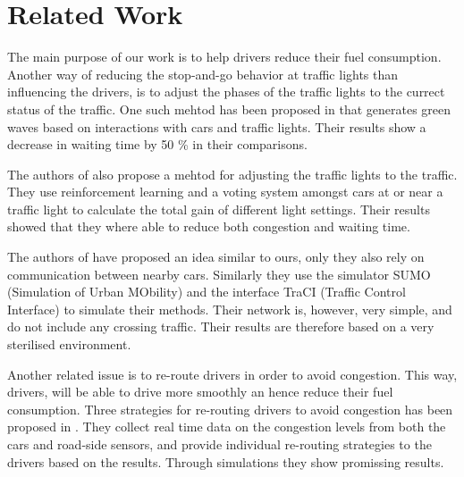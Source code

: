 \section{Related Work}

The main purpose of our work is to help drivers reduce their fuel consumption.
Another way of reducing the stop-and-go behavior at traffic lights than influencing the drivers, is to adjust the phases of the traffic lights to the currect status of the traffic. One such mehtod has been proposed in \cite{SOTL} that generates green waves based on interactions with cars and traffic lights. Their results show a decrease in waiting time by 50 \% in their comparisons.

The authors of \cite{ITLC} also propose a mehtod for adjusting the traffic lights to the traffic. They use reinforcement learning and a voting system amongst cars at or near a traffic light to calculate the total gain of different light settings. Their results showed that they where able to reduce both congestion and waiting time.

The authors of \cite{VANETsim} have proposed an idea similar to ours, only they also rely on communication between nearby cars.
Similarly they use the simulator SUMO (Simulation of Urban MObility) and the interface TraCI (Traffic Control Interface) to simulate their methods. Their network is, however, very simple, and do not include any crossing traffic. Their results are therefore based on a very sterilised environment.

Another related issue is to re-route drivers in order to avoid congestion. This way, drivers, will be able to drive more smoothly an hence reduce their fuel consumption. 
Three strategies for re-routing drivers to avoid congestion has been proposed in \cite{congestionAvoidance}. They collect real time data on the congestion levels from both the cars and road-side sensors, and provide individual re-routing strategies to the drivers based on the results. Through simulations they show promissing results.


